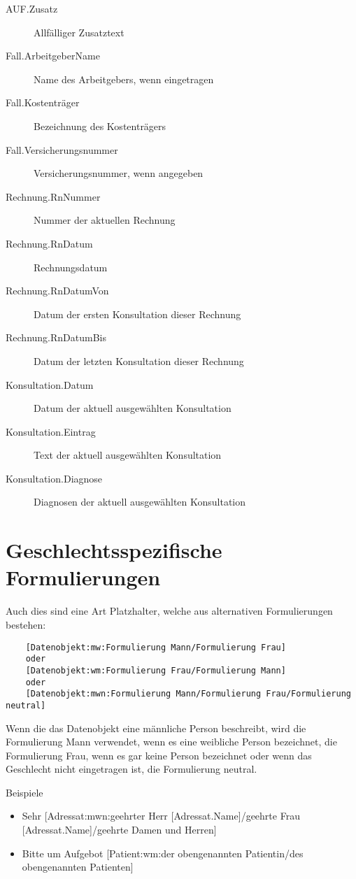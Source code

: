 \begin{description}
  \item [AUF.Zusatz] Allfälliger Zusatztext
  \item [Fall.ArbeitgeberName] Name des Arbeitgebers, wenn eingetragen
  \item [Fall.Kostenträger] Bezeichnung des Kostenträgers
  \item [Fall.Versicherungsnummer] Versicherungsnummer, wenn angegeben
  \item [Rechnung.RnNummer] Nummer der aktuellen Rechnung
  \item [Rechnung.RnDatum] Rechnungsdatum
  \item [Rechnung.RnDatumVon] Datum der ersten Konsultation dieser Rechnung
  \item [Rechnung.RnDatumBis] Datum der letzten Konsultation dieser Rechnung
  \item [Konsultation.Datum] Datum der aktuell ausgewählten Konsultation
  \item [Konsultation.Eintrag] Text der aktuell ausgewählten Konsultation
  \item [Konsultation.Diagnose] Diagnosen der aktuell ausgewählten Konsultation

\end{description}

\section{Geschlechtsspezifische Formulierungen}
Auch dies sind eine Art Platzhalter, welche aus alternativen Formulierungen bestehen:

\begin{verbatim}
    [Datenobjekt:mw:Formulierung Mann/Formulierung Frau]
    oder
    [Datenobjekt:wm:Formulierung Frau/Formulierung Mann]
    oder
    [Datenobjekt:mwn:Formulierung Mann/Formulierung Frau/Formulierung neutral]
\end{verbatim}

Wenn die das Datenobjekt eine  männliche Person beschreibt, wird die Formulierung Mann verwendet, wenn es eine weibliche Person bezeichnet, die Formulierung Frau, wenn es gar keine Person bezeichnet oder wenn das Geschlecht nicht eingetragen ist, die Formulierung neutral.

\medskip

Beispiele
\begin{itemize}
    \item Sehr [Adressat:mwn:geehrter Herr [Adressat.Name]/geehrte Frau [Adressat.Name]/geehrte Damen und Herren]
    \item Bitte um Aufgebot [Patient:wm:der obengenannten Patientin/des obengenannten Patienten]
\end{itemize}
